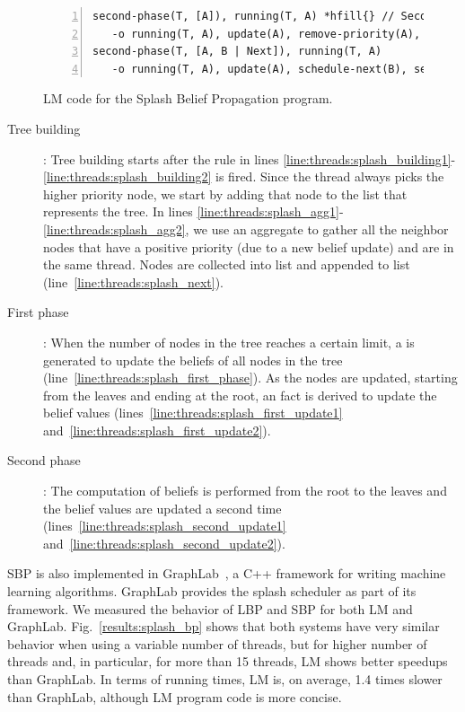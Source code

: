 \begin{figure}[!htb]
\begin{Verbatim}[numbers=left,commandchars=*\{\},fontsize=\codesize]
second-phase(T, [A]), running(T, A) *hfill{} // Second phase
   -o running(T, A), update(A), remove-priority(A), start-tree(T).*label{line:threads:splash_second_update1}
second-phase(T, [A, B | Next]), running(T, A)
   -o running(T, A), update(A), schedule-next(B), second-phase(T, [B | Next]).*label{line:threads:splash_second_update2}
\end{Verbatim}

   \caption{LM code for the Splash Belief Propagation program.}
  \label{code:threads:sbp}
\end{figure}

\begin{description}

   \item[Tree building]: Tree building starts after the rule in lines
      \ref{line:threads:splash_building1}-\ref{line:threads:splash_building2} is
      fired. Since the thread always picks the higher priority node, we start by
      adding that node to the list that represents the tree. In lines
      \ref{line:threads:splash_agg1}-\ref{line:threads:splash_agg2}, we use an
      aggregate to gather all the neighbor nodes that have a positive priority
      (due to a new belief update) and are in the same thread. Nodes are
      collected into list  and appended to list 
      (line~\ref{line:threads:splash_next}).

   \item[First phase]: When the number of nodes in the tree reaches a certain
      limit, a  is generated to update the beliefs of all
      nodes in the tree (line~\ref{line:threads:splash_first_phase}). As the
      nodes are updated, starting from the leaves and ending at the root, an
       fact is derived to update the belief values
      (lines~\ref{line:threads:splash_first_update1}
      and~\ref{line:threads:splash_first_update2}).

   \item[Second phase]: The computation of beliefs is performed from the root to
      the leaves and the belief values are updated a second time
      (lines~\ref{line:threads:splash_second_update1}
      and~\ref{line:threads:splash_second_update2}).

\end{description}

SBP is also implemented in GraphLab~\cite{GraphLab2010}, a C++ framework for
writing machine learning algorithms. GraphLab provides the splash scheduler as
part of its framework. We measured the behavior of LBP and SBP for both LM and
GraphLab. Fig.~\ref{results:splash_bp} shows that both systems have very similar
behavior when using a variable number of threads, but for higher number of
threads and, in particular, for more than 15 threads, LM shows better speedups
than GraphLab. In terms of running times, LM is, on average, 1.4 times slower
than GraphLab, although LM program code is more concise.
